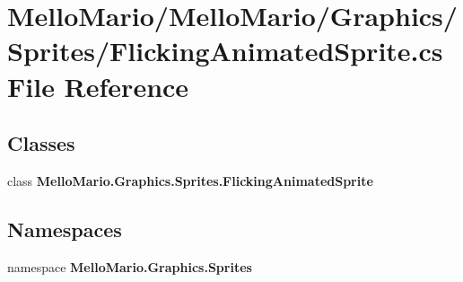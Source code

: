 \section{Mello\+Mario/\+Mello\+Mario/\+Graphics/\+Sprites/\+Flicking\+Animated\+Sprite.cs File Reference}
\label{FlickingAnimatedSprite_8cs}
\subsection*{Classes}
\begin{DoxyCompactItemize}
\item 
class \textbf{ Mello\+Mario.\+Graphics.\+Sprites.\+Flicking\+Animated\+Sprite}
\end{DoxyCompactItemize}
\subsection*{Namespaces}
\begin{DoxyCompactItemize}
\item 
namespace \textbf{ Mello\+Mario.\+Graphics.\+Sprites}
\end{DoxyCompactItemize}
